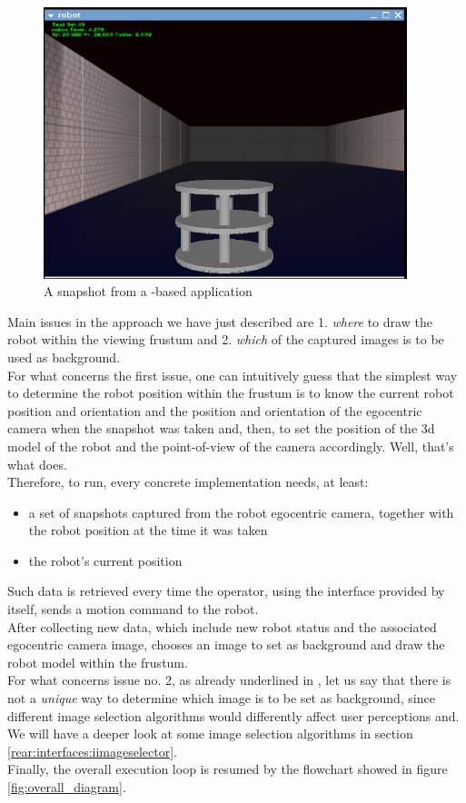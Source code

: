 \begin{figure}[!h]
  \begin{center}
    \includegraphics[width=300pt]{img/rear_snapshot_large.jpg}
    \caption{A snapshot from a \framework{}-based application}
    \label{fig:snap}
  \end{center}
\end{figure}

Main issues in the approach we have just described are 1. 
\textit{where} to draw the robot within the viewing frustum 
and 2. \textit{which} of the captured images is to be used 
as background.
\\
For what concerns the first issue, one can intuitively guess 
that the simplest way to determine the robot position 
within the frustum is to know the current robot position 
and orientation and the position and orientation of the egocentric 
camera when the snapshot was taken and, then, to set the 
position of the 3d model of the robot and the point-of-view 
of the camera accordingly.
Well, that's what \framework{} does.
\\
Therefore, to run, every \framework{} concrete implementation 
needs, at least:

\begin{itemize}
  \item a set of snapshots captured from the robot egocentric camera, 
    together with the robot position at the time it was taken
  \item the robot's current position
\end{itemize}

Such data is retrieved every time the operator, using the 
interface provided by \framework{} itself, sends a 
motion command to the robot.
\\
After collecting new data, which include new robot status and
the associated egocentric camera image, \framework{} chooses 
an image to set as background and draw the robot model within 
the frustum.
\\
For what concerns issue no. 2, as already 
underlined in \cite{sugimoto}, let us say that there is not 
a \textit{unique} way to determine which image is to be set 
as background, since different image selection algorithms 
would differently affect user perceptions and. We will have a 
deeper look at some image selection algorithms in section
\ref{rear:interfaces:iimageselector}.
\\
Finally, the overall execution loop is resumed by the flowchart 
showed in figure \ref{fig:overall_diagram}.


